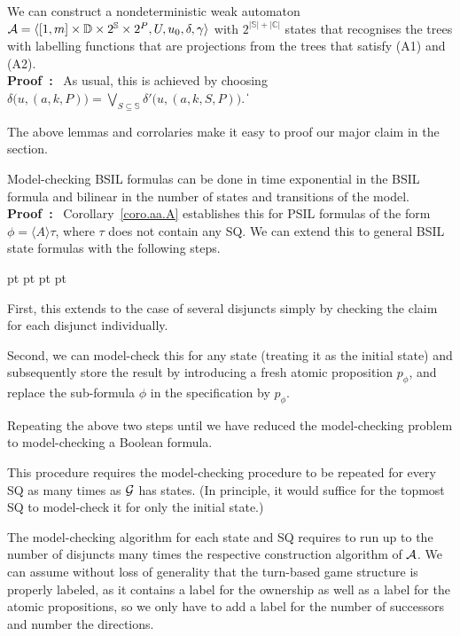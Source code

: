\documentclass[11pt]{article}
\newcommand{\cala}{{\cal A}}
\newcommand{\calg}{{\cal G}}
\newcommand{\pf}{\noindent\mbox{\bf Proof : }}
\newcommand{\bbbbc}{{\mathbb C}}
\newcommand{\bbbbd}{{\mathbb D}}
\newcommand{\bbbbs}{{\mathbb S}}
\def\qed{\ifmmode\|\else{\unskip\nobreak\hfil
\penalty50\hskip1em\null\nobreak\hfil$\blacksquare$
\parfillskip=0pt\finalhyphendemerits=0\endgraf}\fi}
\newcounter{sequent1}
\newcounter{sequent2}
\newcounter{sequent3}
\newcounter{sequent4}
\newenvironment{stmt1}{\begin{list}{(\arabic{sequent1})}
  {\usecounter{sequent1}
    \topsep 0 pt \parsep 2 pt \partopsep 0 pt \itemsep 0 pt
} }{\end{list}}
\begin{document}
{\corollary\label{coro.aa.A}
We can construct a nondeterministic weak automaton 
$\cala=\langle [1,m] \times \bbbbd \times 2^\bbbbs \times 2^P,
U,u_0,\delta, \gamma \rangle$ 
with $2^{|\bbbbs|+|\bbbbc|}$ states that recognises 
the trees with labelling functions that are projections from 
the trees that satisfy (A1) and (A2).
}
\\\pf 
As usual, this is achieved by choosing 
$\delta\big(u,(a,k,P)\big) = 
\bigvee_{S \subseteq \bbbbs}\delta'\big(u,(a,k,S,P)\big)$.
\qed 

The above lemmas and corrolaries  
make it easy to proof our major claim in the section.  

{\theorem\label{thm.aa.main}
Model-checking BSIL formulas can be done in time exponential in the BSIL formula and bilinear in the number of states and transitions of the model.
}
\\\pf 
Corollary~\ref{coro.aa.A} 
establishes this for PSIL formulas of the form 
$\phi=\langle A \rangle \tau$, where $\tau$ does not contain any SQ.
We can extend this to general BSIL state formulas with the following 
steps. 
\begin{stmt1} 
\item First, this extends to the case of several disjuncts simply 
  by checking the claim for each disjunct individually.
\item Second, we can model-check this for any state (treating it as the initial state) and subsequently store the result by introducing a fresh atomic proposition $p_\phi$, and replace the sub-formula $\phi$ in the specification by $p_\phi$.
\item Repeating the above two steps until we have reduced 
  the model-checking problem to model-checking a Boolean formula.
\end{stmt1} 
This procedure requires the model-checking procedure 
to be repeated for every SQ as many times as $\calg$ has states.
(In principle, it would suffice for the topmost SQ to model-check it 
for only the initial state.)

The model-checking algorithm for each state and SQ requires 
to run up to the number of disjuncts many times the respective 
construction algorithm of $\cala$.
We can assume without loss of generality that the turn-based game structure is properly labeled, as it contains a label for the ownership as well as a label for the atomic propositions, so we only have to add a label for the number of successors and number the directions.
\end{document}

